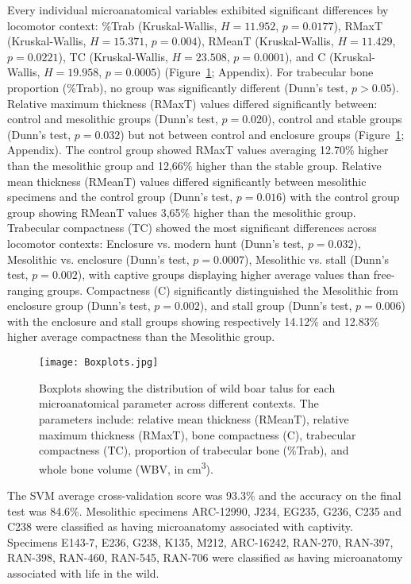 \documentclass[12pt,a4paper]{article}
\begin{document}
Every individual microanatomical variables exhibited significant differences by locomotor context: \%Trab (Kruskal-Wallis, $H = 11.952$, $p = 0.0177$), RMaxT (Kruskal-Wallis, $H = 15.371$, $p = 0.004$), RMeanT (Kruskal-Wallis, $H = 11.429$, $p =0.0221$), TC (Kruskal-Wallis, $H = 23.508$, $p = 0.0001$), and C (Kruskal-Wallis, $H = 19.958$, $p = 0.0005$) (Figure~\ref{Boxplots}; Appendix). For trabecular bone proportion (\%Trab), no group was significantly different (Dunn's test, $p > 0.05$). Relative maximum thickness (RMaxT) values differed significantly between: control and mesolithic groups (Dunn's test, $p = 0.020$), control and stable groups (Dunn's test, $p = 0.032$) but not between control and enclosure groups (Figure~\ref{Boxplots}; Appendix). The control group showed RMaxT values averaging 12.70\% higher than the mesolithic group and 12,66\% higher than the stable group.
Relative mean thickness (RMeanT) values differed significantly between mesolithic specimens and the	control	group (Dunn's test, $p = 0.016$) with the control group group showing RMeanT values 3,65\% higher than the mesolithic group.
Trabecular compactness (TC) showed the most significant differences across locomotor contexts: Enclosure vs. modern hunt (Dunn's test, $p = 0.032 $), Mesolithic vs. enclosure (Dunn's test, $p = 0.0007$), Mesolithic vs. stall (Dunn's test, $p = 0.002$), with captive groups displaying higher average values than free-ranging groups.  
Compactness (C) significantly distinguished the Mesolithic from enclosure group (Dunn's test, $p = 0.002 $), and stall group (Dunn's test, $p = 0.006 $) with the enclosure and stall groups showing respectively 14.12\% and 12.83\% higher average compactness than the Mesolithic group. %

\begin{figure}[H]
	\texttt{[image: Boxplots.jpg]}
	\caption{Boxplots showing the distribution of wild boar talus for each microanatomical parameter across different contexts. The parameters include: relative mean thickness (RMeanT), relative maximum thickness (RMaxT), bone compactness (C), trabecular compactness (TC), proportion of trabecular bone (\%Trab), and whole bone volume (WBV, in cm\textsuperscript{3}).}
	\label{Boxplots}
\end{figure}

The SVM average cross-validation score was 93.3\% and the accuracy on the final test was 84.6\%. Mesolithic specimens ARC-12990, J234, EG235, G236, C235 and C238 were classified as having microanatomy associated with captivity. Specimens E143-7, E236, G238, K135, M212, ARC-16242, RAN-270, RAN-397, RAN-398, RAN-460, RAN-545, RAN-706 were classified as having microanatomy associated with life in the wild.
\end{document}
